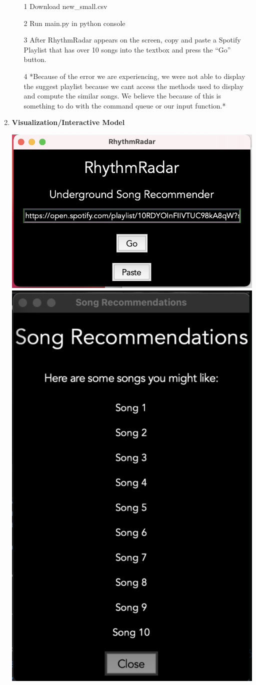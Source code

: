 \documentclass[fontsize=11pt]{article}
\begin{document}
\begin{enumerate}
    \begin{enumerate}

        \item [1] Download new\_small.csv
        \item [2] Run main.py in python console
        \item [3] After RhythmRadar appears on the screen, copy and paste a Spotify Playlist that has over 10 songs into the textbox and press the “Go” button.
        \item[4] *Because of the error we are experiencing, we were not able to display the suggest playlist because we cant access the methods used to display and compute the similar songs. We believe the because of this is something to do with the command queue or our input function.*
    \end{enumerate}
    
\item \textbf{Visualization/Interactive Model} 

\includegraphics[width=.8\textwidth]{rr_main.png} \newline
\includegraphics[width=.5\textwidth]{recommendation.png}


\end{enumerate}
\end{document}
